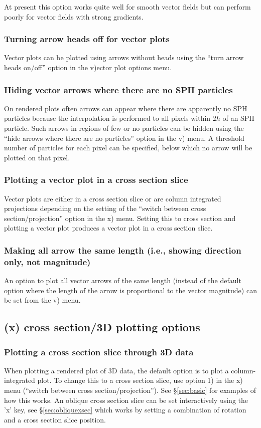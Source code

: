 \documentclass[a4paper,10pt]{article}
\begin{document}
  At present this option works quite well for smooth vector fields but can perform poorly for vector fields with strong gradients.

\subsubsection{ Turning arrow heads off for vector plots}
 Vector plots can be plotted using arrows without heads using the ``turn arrow heads on/off'' option in the v)ector plot options menu.

\subsubsection{ Hiding vector arrows where there are no SPH particles}
 On rendered plots often arrows can appear where there are apparently no SPH particles because the interpolation is performed to all pixels within $2h$ of an SPH particle. Such arrows in regions of few or no particles can be hidden using the ``hide arrows where there are no particles'' option in the v) menu. A threshold number of particles for each pixel can be specified, below which no arrow will be plotted on that pixel.

\subsubsection{ Plotting a vector plot in a cross section slice}
 Vector plots are either in a cross section slice or are column integrated projections depending on the setting of the ``switch between cross section/projection'' option in the x) menu. Setting this to cross section and plotting a vector plot produces a vector plot in a cross section slice.

\subsubsection{ Making all arrow the same length (i.e., showing direction only, not magnitude)}
 An option to plot all vector arrows of the same length (instead of the default option where the length of the arrow is proportional to the vector magnitude) can be set from the v) menu.

\subsection{(x) cross section/3D plotting options}

\subsubsection{ Plotting a cross section slice through 3D data}
 When plotting a rendered plot of 3D data, the default option is to plot a column-integrated plot. To change this to a cross section slice, use option 1) in the x) menu (``switch between cross section/projection''). See \S\ref{sec:basic} for examples of how this works. An oblique cross section slice can be set interactively using the 'x' key, see \S\ref{sec:obliquexsec} which works by setting a combination of rotation and a cross section slice position. 
\end{document}
